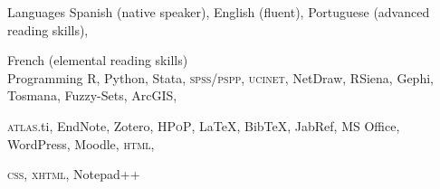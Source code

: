 





\begin{cvskills}

\cvskill
{Languages} 
{Spanish (native speaker), English (fluent), Portuguese (advanced reading skills),} 

\cvskill
{} 
{French (elemental reading skills)} \\

\cvskill
{Programming} 
{R, Python, Stata, {\scshape spss/pspp}, {\scshape ucinet}, NetDraw, RSiena, Gephi, Tosmana, Fuzzy-Sets, ArcGIS,}

\cvskill
{} 
{{\scshape atlas}.ti, EndNote, Zotero, {\scshape HPoP}, {\LaTeX}, Bib{\TeX}, JabRef, MS Office, WordPress, Moodle, {\scshape html},} 

\cvskill
{} 
{{\scshape css}, {\scshape xhtml}, Notepad{\footnotesize ++}} \\

\end{cvskills}
